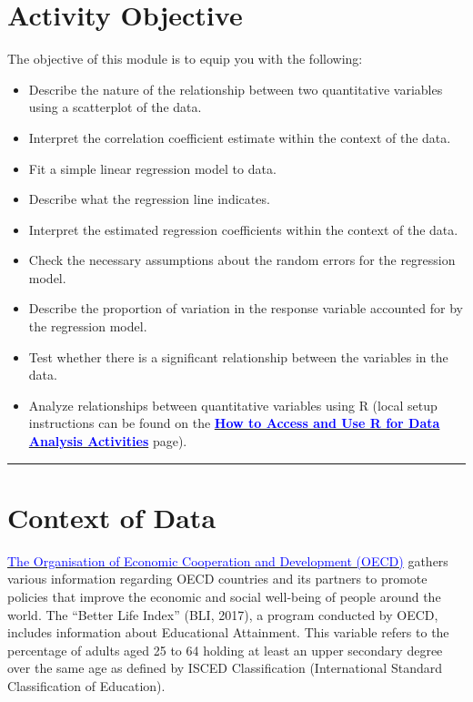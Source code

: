 \documentclass[oneside,openany]{book}
\begin{document}
\section{Activity Objective}\label{activity-objective-7}

The objective of this module is to equip you with the following:

\begin{itemize}
    \item Describe the nature of the relationship between two quantitative variables using a scatterplot of the data.
    \item Interpret the correlation coefficient estimate within the context of the data.
    \item Fit a simple linear regression model to data.
    \item Describe what the regression line indicates.
    \item Interpret the estimated regression coefficients within the context of the data.
    \item Check the necessary assumptions about the random errors for the regression model.
    \item Describe the proportion of variation in the response variable accounted for by the regression model.
    \item Test whether there is a significant relationship between the variables in the data.
    \item Analyze relationships between quantitative variables using R (local setup instructions can be found on the \hyperref[how-to-set-up-r-for-data-analysis-activities]{\textcolor{blue}{\textbf{How to Access and Use R for Data Analysis Activities}}} page).
\end{itemize}


\begin{center}\rule{0.5\linewidth}{0.5pt}\end{center}

\section{Context of Data}\label{context-of-data}

\href{http://www.oecd.org/about/}{\textcolor{blue}{The Organisation of Economic Cooperation and Development (OECD)}} gathers various information regarding OECD countries and its partners to promote policies that improve the economic and social well-being of people around the world. The ``Better Life Index'' (BLI, 2017), a program conducted by OECD, includes information about Educational Attainment. This variable refers to the percentage of adults aged 25 to 64 holding at least an upper secondary degree over the same age as defined by ISCED Classification (International Standard Classification of Education).
\end{document}
